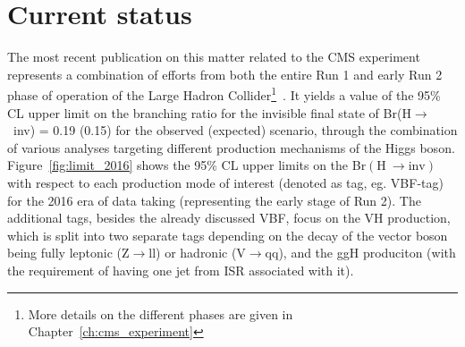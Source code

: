 
\section{Current status}
\hspace{10pt} The most recent publication on this matter related to the CMS experiment represents a combination of efforts from both the entire Run 1 and early Run 2 phase of operation of the Large Hadron Collider\footnote{More details on the different phases are given in Chapter~\ref{ch:cms_experiment}}~\cite{paper:HIG_17_023}. It yields a value of the 95\% CL upper limit on the branching ratio for the invisible final state of Br(H$\rightarrow$~inv) = 0.19 (0.15) for the observed (expected) scenario, through the combination of various analyses targeting different production mechanisms of the Higgs boson. Figure~\ref{fig:limit_2016} shows the 95\% CL upper limits on the Br$(\text{H}~\rightarrow \text{inv})$ with respect to each production mode of interest (denoted as tag, eg. VBF-tag) for the 2016 era of data taking (representing the early stage of Run 2). The additional tags, besides the already discussed VBF, focus on the VH production, which is split into two separate tags depending on the decay of the vector boson being fully leptonic (Z$\rightarrow$ll) or hadronic (V$\rightarrow$qq), and the ggH produciton (with the requirement of having one jet from ISR associated with it).


